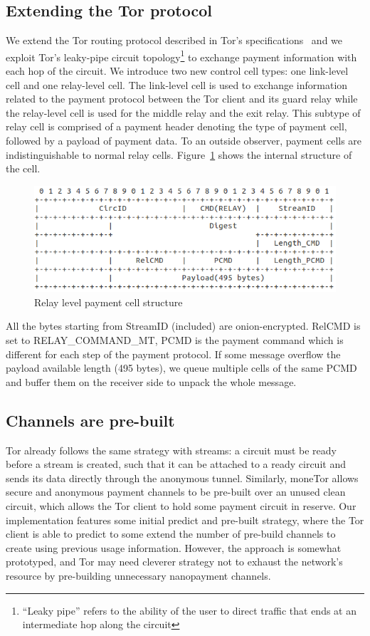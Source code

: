 
\subsection{Extending the Tor protocol}

We extend the Tor routing protocol described in Tor's
specifications~\cite{dingledine2018tor} and we exploit Tor's leaky-pipe circuit
topology\footnote{``Leaky pipe'' refers to the ability of the user to direct
  traffic that ends at an intermediate hop along the circuit} to exchange
payment information with each hop of the circuit. We introduce two new control
cell types: one link-level cell and one relay-level cell. The link-level cell is
used to exchange information related to the payment protocol between the Tor
client and its guard relay while the relay-level cell is used for the middle
relay and the exit relay. This subtype of relay cell is comprised of a payment
header denoting the type of payment cell, followed by a payload of payment
data. To an outside observer, payment cells are indistinguishable to normal
relay cells. Figure~\ref{fig:relay_command_mt_structure} shows the internal structure of the cell.
\begin{figure}[h]
    \centering
    \includegraphics[scale=0.38]{images/payment_cell_header.png}
    \caption{Relay level payment cell structure}
\label{fig:relay_command_mt_structure}
\end{figure}

All the bytes starting from StreamID (included) are onion-encrypted. RelCMD is set to RELAY\_COMMAND\_MT, PCMD is the payment command which is different for each step of the payment protocol. If some message overflow the payload available length (495 bytes), we queue multiple cells of the same PCMD and buffer them on the receiver side to unpack the whole message.

\subsection{Channels are pre-built}
Tor already follows the
same strategy with streams: a circuit must be ready before a stream is created,
such that it can be attached to a ready circuit and sends its data directly
through the anonymous tunnel. Similarly, moneTor allows secure and anonymous
payment channels to be pre-built over an unused clean circuit, which allows the Tor client to hold some payment circuit in reserve. Our implementation features some initial predict and pre-built strategy, where the Tor client is able to predict to some extend the number of pre-build channels to create using previous usage information. However, the approach is somewhat prototyped, and Tor may need cleverer strategy not to exhaust the network's resource by pre-building unnecessary nanopayment channels.

